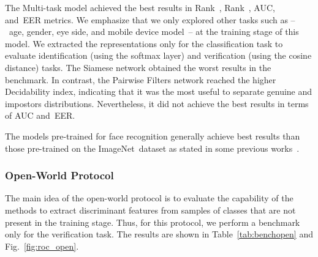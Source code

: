 The Multi-task model achieved the best results in Rank~, Rank~, AUC, and~EER metrics.
We emphasize that we only explored other tasks such as --~age, gender, eye side, and mobile device model~-- at the training stage of this model.
We extracted the representations only for the classification task to evaluate identification (using the softmax layer) and verification (using the cosine distance) tasks.
The Siamese network obtained the worst results in the benchmark.
In contrast, the Pairwise Filters network reached the higher Decidability index, indicating that it was the most useful to separate genuine and impostors distributions.
Nevertheless, it did not achieve the best results in terms of AUC and~EER.

The models pre-trained for face recognition generally achieve best results than those pre-trained on the ImageNet~dataset as stated in some previous works~\cite{Luz2018, boyd2019fine}.


\subsubsection{Open-World Protocol}
\label{sec:open}

The main idea of the open-world protocol is to evaluate the capability of the methods to extract discriminant features from samples of classes that are not present in the training stage.
Thus, for this protocol, we perform a benchmark only for the verification task.
The results are shown in Table~\ref{tab:benchopen} and Fig.~\ref{fig:roc_open}.


